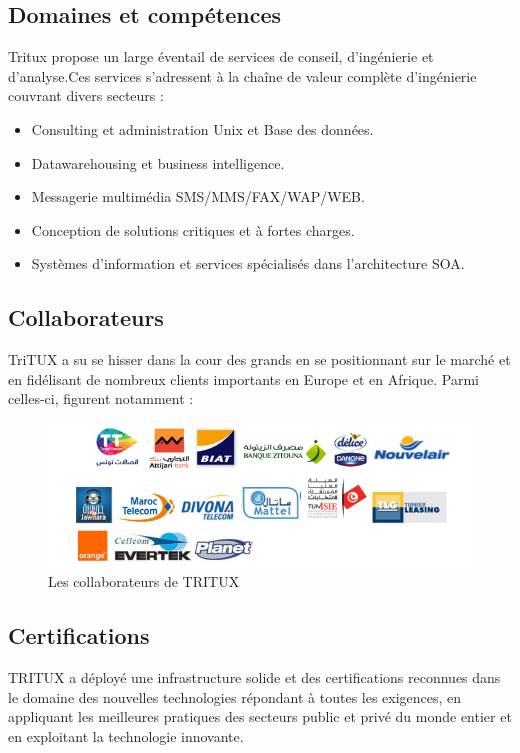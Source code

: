 \subsection{Domaines et compétences }
Tritux propose un large éventail de services de conseil, d'ingénierie et d'analyse.Ces
services s'adressent à la chaîne de valeur complète d'ingénierie couvrant divers secteurs :
\begin{itemize}
	\item Consulting et administration Unix et Base des données.
	\item Datawarehousing et business intelligence.
	\item Messagerie multimédia SMS/MMS/FAX/WAP/WEB.
	\item Conception de solutions critiques et à fortes charges.
	\item Systèmes d'information et services spécialisés dans l'architecture SOA.
\end{itemize}

\subsection{Collaborateurs}
TriTUX a su se hisser dans la cour des grands en se positionnant sur le marché et
en fidélisant de nombreux clients importants en Europe et en Afrique. Parmi celles-ci,
figurent notamment :
\begin{figure}[ht]
	\centering
	\includegraphics[scale=0.5]{collaborateurs.png}
	\caption{Les collaborateurs de TRITUX}
	\label{Les collaborateurs de TRITUX}
\end{figure}

\subsection{Certifications}
TRITUX a déployé une infrastructure solide et des certifications reconnues dans le
domaine des nouvelles technologies répondant à toutes les exigences, en appliquant les
meilleures pratiques des secteurs public et privé du monde entier et en exploitant la technologie innovante.

